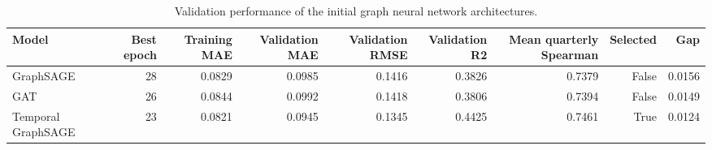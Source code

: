 \begin{table}
\caption{Validation performance of the initial graph neural network architectures.}
\label{tab:gnn-architecture-validation-comparison}
\begin{tabular}{lrrrrrrrr}
\toprule
Model & Best epoch & Training MAE & Validation MAE & Validation RMSE & Validation R2 & Mean quarterly Spearman & Selected & Gap \\
\midrule
GraphSAGE & 28 & 0.0829 & 0.0985 & 0.1416 & 0.3826 & 0.7379 & False & 0.0156 \\
GAT & 26 & 0.0844 & 0.0992 & 0.1418 & 0.3806 & 0.7394 & False & 0.0149 \\
Temporal GraphSAGE & 23 & 0.0821 & 0.0945 & 0.1345 & 0.4425 & 0.7461 & True & 0.0124 \\
\bottomrule
\end{tabular}
\end{table}

